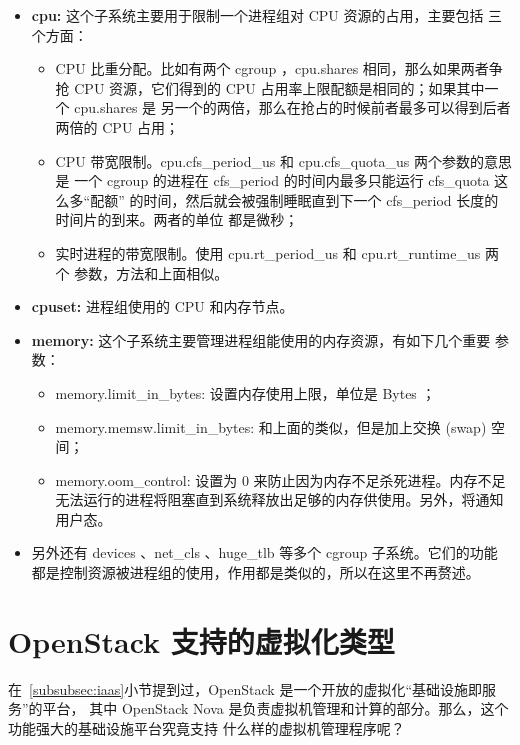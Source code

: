 \begin{itemize}
    \item \textbf{cpu:} 这个子系统主要用于限制一个进程组对 CPU 资源的占用，主要包括
    三个方面：
    \begin{itemize}
        \item CPU 比重分配。比如有两个 cgroup ，cpu.shares 相同，那么如果两者争抢
        CPU 资源，它们得到的 CPU 占用率上限配额是相同的；如果其中一个 cpu.shares 是
        另一个的两倍，那么在抢占的时候前者最多可以得到后者两倍的 CPU 占用；
        \item CPU 带宽限制。cpu.cfs\_period\_us 和 cpu.cfs\_quota\_us 两个参数的意思是
        一个 cgroup 的进程在 cfs\_period 的时间内最多只能运行 cfs\_quota 这么多“配额”
        的时间，然后就会被强制睡眠直到下一个 cfs\_period 长度的时间片的到来。两者的单位
        都是微秒；
        \item 实时进程的带宽限制。使用 cpu.rt\_period\_us 和 cpu.rt\_runtime\_us 两个
        参数，方法和上面相似。
    \end{itemize}
    \item \textbf{cpuset:} 进程组使用的 CPU 和内存节点。
    \item \textbf{memory:} 这个子系统主要管理进程组能使用的内存资源，有如下几个重要
    参数：
    \begin{itemize}
        \item memory.limit\_in\_bytes: 设置内存使用上限，单位是 Bytes ；
        \item memory.memsw.limit\_in\_bytes: 和上面的类似，但是加上交换 (swap) 空间；
        \item memory.oom\_control: 设置为 0 来防止因为内存不足杀死进程。内存不足
        无法运行的进程将阻塞直到系统释放出足够的内存供使用。另外，将通知用户态。
    \end{itemize}
    \item 另外还有 devices 、net\_cls 、huge\_tlb 等多个 cgroup 子系统。它们的功能
    都是控制资源被进程组的使用，作用都是类似的，所以在这里不再赘述。
\end{itemize}

\section{OpenStack 支持的虚拟化类型}

在~\ref{subsubsec:iaas}小节提到过，OpenStack 是一个开放的虚拟化“基础设施即服务”的平台，
其中 OpenStack Nova 是负责虚拟机管理和计算的部分。那么，这个功能强大的基础设施平台究竟支持
什么样的虚拟机管理程序呢？

